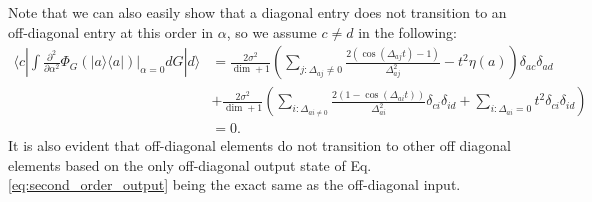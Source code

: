 \documentclass{article}
\newcommand{\ket}[1]{|#1\rangle}
\newcommand{\bra}[1]{\langle #1|}
\newcommand{\ketbra}[2]{| #1\rangle\! \langle #2|}
\newcommand{\parens}[1]{\left( #1 \right)}
\begin{document}
Note that we can also easily show that a diagonal entry does not transition to an off-diagonal entry at this order in $\alpha$, so we assume $c \neq d$ in the following:
\begin{align}
    \bra{c} \int \frac{\partial^2}{\partial \alpha^2} \Phi_G(\ketbra{a}{a}) \bigg|_{\alpha = 0} dG \ket{d} &= \frac{2 \sigma^2}{\dim + 1} \parens{\sum_{j : \Delta_{aj} \neq 0} \frac{2(\cos(\Delta_{aj}t) - 1)}{\Delta_{aj}^2} - t^2 \eta(a)} \delta_{ac} \delta_{ad} \nonumber \\
    & + \frac{2 \sigma^2}{\dim + 1}  \parens{\sum_{i: \Delta_{ai \neq 0} }\frac{2(1 - \cos(\Delta_{ai}t))}{\Delta_{ai}^2} \delta_{ci} \delta_{id} + \sum_{i : \Delta_{ai} = 0} t^2 \delta_{ci} \delta_{id}} \\
    &= 0.
\end{align}
It is also evident that off-diagonal elements do not transition to other off diagonal elements based on the only off-diagonal output state of Eq. \eqref{eq:second_order_output} being the exact same as the off-diagonal input. 
\end{document}
